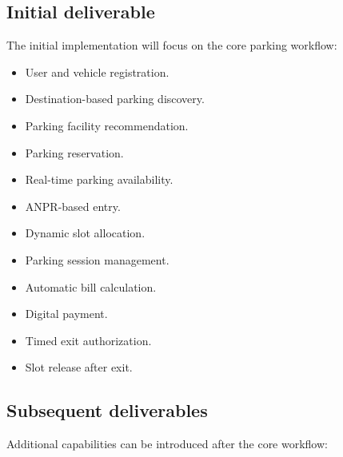 \documentclass[12pt,a4paper]{article}
\begin{document}
\subsection{Initial deliverable}

The initial implementation will focus on the core parking workflow:

\begin{itemize}
    \item User and vehicle registration.

    \item Destination-based parking discovery.

    \item Parking facility recommendation.

    \item Parking reservation.

    \item Real-time parking availability.

    \item ANPR-based entry.

    \item Dynamic slot allocation.

    \item Parking session management.

    \item Automatic bill calculation.

    \item Digital payment.

    \item Timed exit authorization.

    \item Slot release after exit.
\end{itemize}

\subsection{Subsequent deliverables}

Additional capabilities can be introduced after the core workflow:
\end{document}
